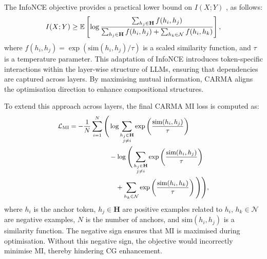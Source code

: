 The InfoNCE objective provides a practical lower bound on \(I(X; Y)\) \cite{oord2018representation}, as follows:
\begin{equation}
\small
    I(X; Y) \geq \mathbb{E} \left[ \log \frac{\sum_{h_j \in \mathbf{H}} f(h_i, h_j)}{\sum_{h_j \in \mathbf{H}} f(h_i, h_j) + \sum_{h_k \in \mathcal{N}} f(h_i, h_k)} \right],
\end{equation}
where \(f(h_i, h_j) = \exp(\text{sim}(h_i, h_j) / \tau)\) is a scaled similarity function, and \(\tau\) is a temperature parameter. This adaptation of InfoNCE introduces token-specific interactions within the layer-wise structure of LLMs, ensuring that dependencies are captured across layers. By maximising mutual information, CARMA aligns the optimisation direction to enhance compositional structures.

To extend this approach across layers, the final CARMA MI loss is computed as:
\begin{equation}
\small
\begin{aligned}
    \mathcal{L}_{\text{MI}} = - \frac{1}{N} \sum_{i=1}^N \Bigg( 
    &\log \sum_{\substack{h_j \in \mathbf{H} \\ j \neq i}} \exp\left(\frac{\text{sim}(h_i, h_j)}{\tau}\right) \\
    &- \log \Bigg( \sum_{\substack{h_j \in \mathbf{H} \\ j \neq i}} \exp\left(\frac{\text{sim}(h_i, h_j)}{\tau}\right) \\
    &\quad + \sum_{h_k \in \mathcal{N}} \exp\left(\frac{\text{sim}(h_i, h_k)}{\tau}\right) \Bigg) \Bigg),
\end{aligned}
\end{equation}
where \(h_i\) is the anchor token, \(h_j \in \mathbf{H}\) are positive examples related to \(h_i\), \(h_k \in \mathcal{N}\) are negative examples, \(N\) is the number of anchors, and \(\text{sim}(h_i, h_j)\) is a similarity function. The negative sign ensures that MI is maximised during optimisation. Without this negative sign, the objective would incorrectly minimise MI, thereby hindering CG enhancement.


